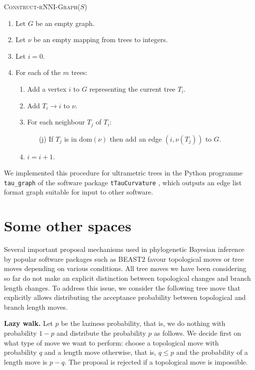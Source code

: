 \documentclass{amsart}
\newcommand{\rnni}{\mathrm{rNNI}}
\newcommand{\dom}{\mathrm{dom}}
\begin{document}
\textsc{Construct-$\rnni$-Graph($S$)}
\begin{enumerate}[1.]
	\item Let $G$ be an empty graph.
	\item Let $\nu$ be an empty mapping from trees to integers.
	\item Let $i = 0$.
	\item For each of the $m$ trees: \vspace{-0.2em}
		\begin{enumerate}
			\item Add a vertex $i$ to $G$ representing the current tree $T_i$.
			\item Add $T_i \rightarrow i$ to $\nu$.
			\item For each neighbour $T_j$ of $T_i$:
				\begin{enumerate}
					\item[(j)] If $T_j$ is in $\dom(\nu)$ then add an edge $(i, \nu(T_j))$ to $G$.
				\end{enumerate}
		\item $i = i + 1$.
		\end{enumerate}
\end{enumerate}

We implemented this procedure for ultrametric trees in the Python programme \texttt{tau\_graph}
of the software package \texttt{tTauCurvature} \autocite{tTauCurvature},
which outputs an edge list format graph suitable for input to other software.


\section{Some other spaces}

Several important proposal mechanisms used in phylogenetic Bayesian inference by popular software packages such as BEAST2 \autocite{beast2} favour topological moves or tree moves depending on various conditions.
All tree moves we have been considering so far do not make an explicit distinction between topological changes and branch length changes.
To address this issue, we consider the following tree move that explicitly allows distributing the acceptance probability between topological and branch length moves.

{\bf Lazy walk.}
Let $p$ be the laziness probability, that is, we do nothing with probability $1-p$ and distribute the probability $p$ as follows.
We decide first on what type of move we want to perform: choose a topological move with probability $q$ and a length move otherwise, that is, $q \leq p$ and the probability of a length move is $p-q$.
The proposal is rejected if a topological move is impossible.
\end{document}
